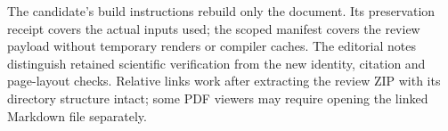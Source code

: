 \documentclass[11pt,a4paper]{article}
\begin{document}
The candidate's build instructions rebuild only the document. Its preservation receipt covers the actual inputs used; the scoped manifest covers the review payload without temporary renders or compiler caches. The editorial notes distinguish retained scientific verification from the new identity, citation and page-layout checks. Relative links work after extracting the review ZIP with its directory structure intact; some PDF viewers may require opening the linked Markdown file separately.


\end{document}
